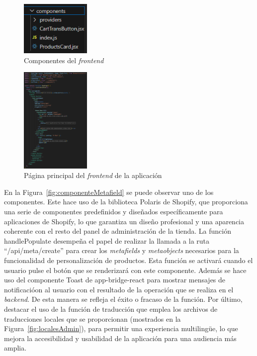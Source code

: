 \documentclass[11pt]{article}
\begin{document}
\begin{figure}[H]
    \centering
    \includegraphics[width=0.3\textwidth]{imagenes-admin/componentes-admin.png}
    \caption{\label{fig:componentes} Componentes del \textit{frontend} }
    \vspace{\fill}
\end{figure}



\begin{figure}[H]
    \centering
    \includegraphics[width=0.3\textwidth]{imagenes-admin/paginaHome.png}
    \caption{\label{fig:homepage} Página principal del \textit{frontend} de la aplicación }
    \vspace{\fill}
\end{figure}

En la Figura~\ref{fig:componenteMetafield} se puede observar uno de los componentes. Este hace uso de la biblioteca Polaris de Shopify, que proporciona una serie de componentes predefinidos
y diseñados específicamente para aplicaciones de Shopify, lo que garantiza un diseño profesional y una aparencia coherente con el resto del panel de administración de la tienda.
La función handlePopulate desempeña el papel de realizar la llamada a la ruta ``/api/meta/create'' para crear los \textit{metafields} y \textit{metaobjects} necesarios para la funcionalidad de personalización de productos.
Esta función se activará cuando el usuario pulse el botón que se renderizará con este componente. Además se hace uso del componente Toast de app-bridge-react para mostrar
mensajes de notificacióon al usuario con el resultado de la operación que se realiza en el \textit{backend}. De esta manera se refleja el éxito o fracaso de la función. Por último, destacar el uso de la función
de traducción que emplea los archivos de traducciones locales que se proporcionan (mostrados en la Figura~\ref{fig:localesAdmin}), para permitir una experiencia multilingüe, lo que mejora
la accesibilidad y usabilidad de la aplicación para una audiencia más amplia.
\end{document}
